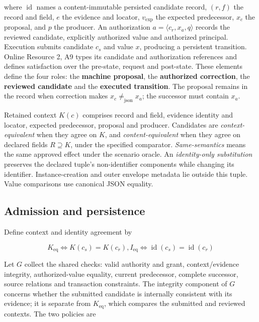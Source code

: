 \documentclass[pdflatex,sn-basic]{sn-jnl}
\begin{document}
where \(\operatorname{id}\) names a content-immutable persisted candidate record, \((r,f)\) the record and field, \(e\) the evidence and locator, \(v_{\mathrm{exp}}\) the expected predecessor, \(x_c\) the proposal, and \(p\) the producer. An authorization \(a = \langle c_r, x_a, q\rangle\) records the reviewed candidate, explicitly authorized value and authorized principal. Execution submits candidate \(c_s\) and value \(x\), producing a persistent transition. Online Resource 2, A9 types its candidate and authorization references and defines satisfaction over the pre-state, request and post-state. These elements define the four roles: the \textbf{machine proposal}, the \textbf{authorized correction}, the \textbf{reviewed candidate} and the \textbf{executed transition}. The proposal remains in the record when correction makes \(x_c \ne _{\mathrm{json}} x_a\); the successor must contain \(x_a\).

Retained context \(K(c)\) comprises record and field, evidence identity and locator, expected predecessor, proposal and producer. Candidates are \emph{context-equivalent} when they agree on \(K\), and \emph{content-equivalent} when they agree on declared fields \(R\supseteq K\), under the specified comparator. \emph{Same-semantics} means the same approved effect under the scenario oracle. An \emph{identity-only substitution} preserves the declared tuple's non-identifier components while changing its identifier. Instance-creation and outer envelope metadata lie outside this tuple. Value comparisons use canonical JSON equality.

\subsection{Admission and persistence}\label{admission-and-persistence}

Define context and identity agreement by

\[
K_{\mathrm{eq}} \Leftrightarrow  K(c_s) = K(c_r),   I_{\mathrm{eq}} \Leftrightarrow  \operatorname{id}(c_s) = \operatorname{id}(c_r)
\]

Let \(G\) collect the shared checks: valid authority and grant, context/evidence integrity, authorized-value equality, current predecessor, complete successor, source relations and transaction constraints. The integrity component of \(G\) concerns whether the submitted candidate is internally consistent with its evidence; it is separate from \(K_{\mathrm{eq}}\), which compares the submitted and reviewed contexts. The two policies are
\end{document}
